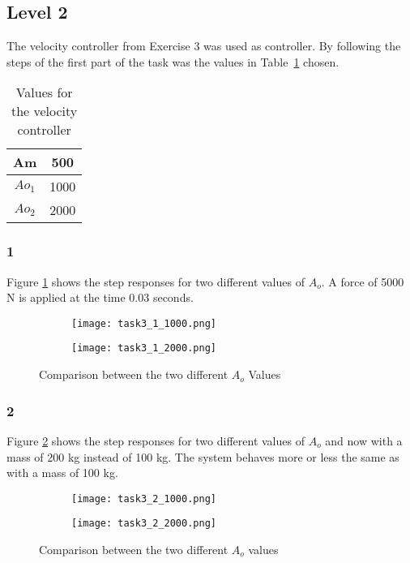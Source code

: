 \subsection*{Level 2}
The velocity controller from Exercise 3 was used as controller.
By following the steps of the first part of the task was the values in
Table~\ref{tbl:table2} chosen. 
\begin{table}[H]
  \centering
    \caption{Values for the velocity controller}
    \begin{tabular}{| c | c |}
		\hline
		Am & 500 \\ \hline
		$Ao_1$ & 1000 \\ \hline
		$Ao_2$ & 2000 \\
		\hline
    \end{tabular}
    \label{tbl:table2}
\end{table}
\subsubsection*{1}
Figure \ref{fig:task3_1_1000} shows the step responses for two different
values of $A_o$. A force of 5000 N is applied at the time 0.03 seconds.
\begin{figure}[H]
    \centering
    \begin{subfigure}[b]{0.45\textwidth}
        \texttt{[image: task3\_1\_1000.png]}
    \end{subfigure}
    \begin{subfigure}[b]{0.45\textwidth}
        \texttt{[image: task3\_1\_2000.png]}
    \end{subfigure}
	\caption{Comparison between the two different $A_o$ Values}
	\label{fig:task3_1_1000}
\end{figure}

\subsubsection*{2}
Figure \ref{fig:task3_2_1000} shows the step responses for two different
values of $A_o$ and now with a mass of 200 kg instead of 100 kg. The system
behaves more or less the same as with a mass of 100 kg.

\begin{figure}[H]
    \centering
    \begin{subfigure}[b]{0.45\textwidth}
        \texttt{[image: task3\_2\_1000.png]}
    \end{subfigure}
    \begin{subfigure}[b]{0.45\textwidth}
        \texttt{[image: task3\_2\_2000.png]}
    \end{subfigure}
	\caption{Comparison between the two different $A_o$ values}
	\label{fig:task3_2_1000}
\end{figure}

